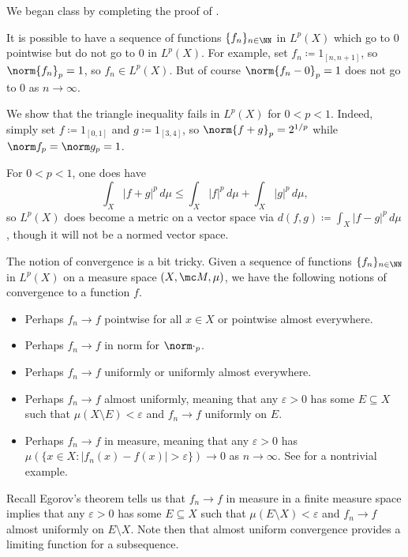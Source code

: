 \documentclass[../notes.tex]{subfiles}
\begin{document}
We began class by completing the proof of .
\begin{remark}
	It is possible to have a sequence of functions $\{f_n\}_{n\in\NN}$ in $L^p(X)$ which go to $0$ pointwise but do not go to $0$ in $L^p(X)$. For example, set $f_n\coloneqq1_{[n,n+1]}$, so $\norm{f_n}_p=1$, so $f_n\in L^p(X)$. But of course $\norm{f_n-0}_p=1$ does not go to $0$ as $n\to\infty$.
\end{remark}
\begin{example}
	We show that the triangle inequality fails in $L^p(X)$ for $0<p<1$. Indeed, simply set $f\coloneqq1_{[0,1]}$ and $g\coloneqq1_{[3,4]}$, so $\norm{f+g}_p=2^{1/p}$ while $\norm f_p=\norm g_p=1$.
\end{example}
\begin{remark}
	For $0<p<1$, one does have
	\[\int_X\left|f+g\right|^p\,d\mu\le\int_X\left|f\right|^p\,d\mu+\int_X\left|g\right|^p\,d\mu,\]
	so $L^p(X)$ does become a metric on a vector space via $d(f,g)\coloneqq\int_X\left|f-g\right|^p\,d\mu$, though it will not be a normed vector space.
\end{remark}
\begin{remark}
	The notion of convergence is a bit tricky. Given a sequence of functions $\{f_n\}_{n\in\NN}$ in $L^p(X)$ on a measure space $(X,\mc M,\mu)$, we have the following notions of convergence to a function $f$.
	\begin{itemize}
		\item Perhaps $f_n\to f$ pointwise for all $x\in X$ or pointwise almost everywhere.
		\item Perhaps $f_n\to f$ in norm for $\norm\cdot_p$.
		\item Perhaps $f_n\to f$ uniformly or uniformly almost everywhere.
		\item Perhaps $f_n\to f$ almost uniformly, meaning that any $\varepsilon>0$ has some $E\subseteq X$ such that $\mu(X\setminus E)<\varepsilon$ and $f_n\to f$ uniformly on $E$.
		\item Perhaps $f_n\to f$ in measure, meaning that any $\varepsilon>0$ has $\mu(\{x\in X:\left|f_n(x)-f(x)\right|>\varepsilon\})\to0$ as $n\to\infty$. See \cite[Example~8.11]{elber-top} for a nontrivial example.
	\end{itemize}
	Recall Egorov's theorem \cite[Theorem~9.13]{elber-top} tells us that $f_n\to f$ in measure in a finite measure space implies that any $\varepsilon>0$ has some $E\subseteq X$ such that $\mu(E\setminus X)<\varepsilon$ and $f_n\to f$ almost uniformly on $E\setminus X$. Note then that almost uniform convergence provides a limiting function for a subsequence.
\end{remark}
\end{document}
